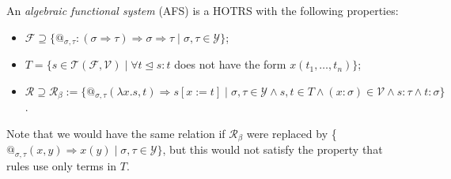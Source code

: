 \documentclass{lmcs}
\theoremstyle{theorem}\newtheorem{theorem}{Theorem}
\theoremstyle{theorem}\newtheorem{lemma}[theorem]{Lemma}
\theoremstyle{theorem}\newtheorem{corollary}[theorem]{Corollary}
\theoremstyle{definition}\newtheorem{definition}[theorem]{Definition}
\theoremstyle{definition}\newtheorem{example}[theorem]{Example}
\newcommand{\F}{\mathcal{F}}
\newcommand{\V}{\mathcal{V}}
\newcommand{\Types}{\mathcal{Y}}
\newcommand{\Terms}{\mathcal{T}}
\newcommand{\Rules}{\mathcal{R}}
\newcommand{\avar}{x}
\newcommand{\bvar}{y}
\newcommand{\abs}[2]{\lambda #1.#2}
\newcommand{\arrtype}{\Rightarrow}
\newcommand{\arrz}{\Rightarrow}
\newcommand{\subtermeq}{\unlhd}
\begin{document}
An \emph{algebraic functional system} (AFS) is a HOTRS with the following properties:
\begin{itemize}
\item $\F \supseteq \{ @_{\sigma,\tau} : (\sigma \arrtype \tau) \arrtype \sigma \arrtype \tau
  \mid \sigma,\tau \in \Types \}$;
\item $T = \{ s \in \Terms(\F,\V) \mid \forall t \subtermeq s: t$ does not have the form
  $\avar(t_1,\dots,t_n)\}$;
\item $\Rules \supseteq \Rules_\beta := \{ @_{\sigma,\tau}(\abs{\avar}{s},t) \arrz s[\avar:=t] \mid
  \sigma,\tau \in \Types \wedge s,t \in T \wedge (\avar : \sigma) \in \V \wedge s : \tau \wedge
  t : \sigma \}$.
\end{itemize}
Note that we would have the same relation if $\Rules_\beta$ were replaced by \{
$@_{\sigma,\tau}(\avar,\bvar) \arrz \avar(\bvar) \mid \sigma,\tau \in \Types \}$, but this would not
satisfy the property that rules use only terms in $T$.
\end{document}
